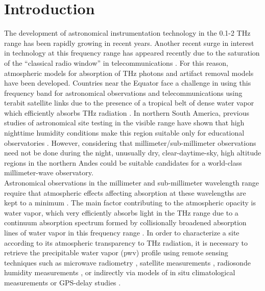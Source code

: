 \documentclass[12pt]{iopart}
\begin{document}
\section{Introduction}

The development of astronomical instrumentation technology in the 0.1-2 THz range has been rapidly growing in recent years. Another recent surge in interest in technology at this frequency range has appeared recently due to the saturation of the ``classical radio window'' in telecommunications  \cite{newera}. For this reason, atmospheric models for absorption of THz photons \cite{rosenkranz,lababs} and artifact removal models \cite{removal} have been developed. Countries near the Equator face a challenge in using this frequency band for astronomical observations and telecommunications using terabit satellite links  \cite{suen2016} due to the presence of a tropical belt of dense water vapor which efficiently absorbs THz radiation \cite{tropicalbelt}. In northern South America, previous studies of astronomical site testing in the visible range have shown that high nighttime humidity conditions make this region suitable only for educational observatories \cite{pinzon}. However, considering that millimeter/sub-millimeter observations need not be done during the night, unusually dry, clear-daytime-sky, high altitude regions in the northern Andes could be suitable candidates for a world-class millimeter-wave observatory. \\

Astronomical observations in the millimeter and sub-millimeter wavelength range require that atmospheric effects affecting absorption at these wavelengths are kept to a minimum \cite{southpole,radford2016,chajpwv}. The main factor contributing to the atmospheric opacity is water vapor, which very efficiently absorbs light in the THz range \cite{pardocerni,pardocerni2,cont350} due to a continuum absorption spectrum formed by collisionally broadened absorption lines of water vapor in this frequency range  \cite{linecont,submmlines,turner2009}. In order to characterize a site according to its atmospheric transparency to THz radiation, it is necessary to retrieve the precipitable water vapor (pwv) profile using remote sensing techniques such as microwave radiometry \cite{radiometer,paine2000fourier,southpole2}, satellite measurements \cite{aqua,spacemols,suen2014,spaceradio}, radiosonde humidity measurements \cite{radiosonde,radiosonde2}, or indirectly via models of in situ climatological measurements \cite{climatology} or GPS-delay studies \cite{gpsmet,gpsorig,gpsmap}. \\
\end{document}
